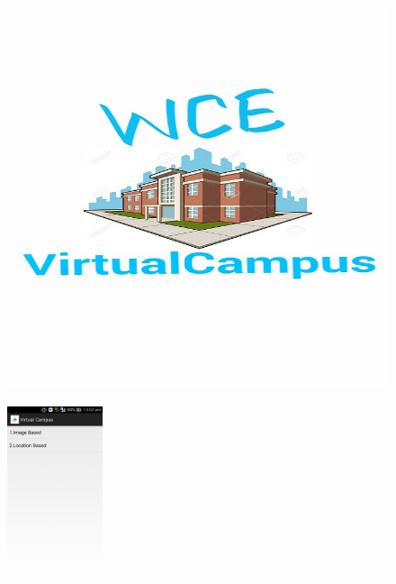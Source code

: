 \documentclass{article}
\begin{document}
\begin{figure}[h]
\centering
\begin{minipage}{.5\textwidth}
  \centering
  \includegraphics[width=.9\linewidth]{Icon.png}
  \label{fig:icon}
\end{minipage}%
\begin{minipage}{.5\textwidth}
  \centering
  \includegraphics[width=.6\linewidth,height=5cm]{AppEntryView.jpg}
  \label{fig:appentry}
\end{minipage}
\end{figure}
\end{document}
